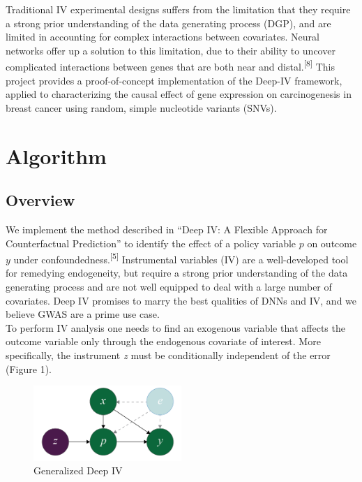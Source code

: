 \documentclass[10.5pt, oneside, twocolumn]{article}   	%
\begin{document}
Traditional IV experimental designs suffers from the limitation that they require a strong prior understanding of the data generating process (DGP), and are limited in accounting for complex interactions between covariates. Neural networks offer up a solution to this limitation, due to their ability to uncover complicated interactions between genes that are both near and distal.\textsuperscript{[8]} This project provides a proof-of-concept implementation of the Deep-IV framework, applied to characterizing the causal effect of gene expression on carcinogenesis in breast cancer using random, simple nucleotide variants (SNVs). 



\section{Algorithm}
\subsection{Overview}
We implement the method described in ``Deep IV: A Flexible Approach for Counterfactual Prediction'' to identify the effect of a policy variable $p$ on outcome $y$ under confoundedness.\textsuperscript{[5]} Instrumental variables (IV) are a well-developed tool for remedying endogeneity, but require a strong prior understanding of the data generating process and are not well equipped to deal with a large number of covariates. Deep IV promises to marry the best qualities of DNNs and IV, and we believe GWAS are a prime use case. \\

To perform IV analysis one needs to find an exogenous variable that affects the outcome variable only through the endogenous covariate of interest. More specifically, the instrument \emph{z} must be conditionally independent of the error (Figure 1).\\

\begin{figure}[h]
	\caption{Generalized Deep IV}
	\centering
	\includegraphics[width=0.5\textwidth]{Figure_1.png}
\end{figure}
\end{document}
